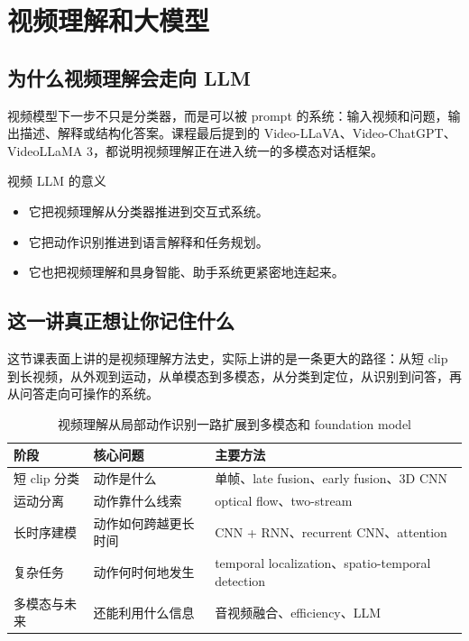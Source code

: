 \section{视频理解和大模型}

\subsection{为什么视频理解会走向 LLM}

视频模型下一步不只是分类器，而是可以被 prompt 的系统：输入视频和问题，输出描述、解释或结构化答案。课程最后提到的 Video-LLaVA、Video-ChatGPT、VideoLLaMA 3，都说明视频理解正在进入统一的多模态对话框架。

\begin{importantbox}{视频 LLM 的意义}
\begin{itemize}
    \item 它把视频理解从分类器推进到交互式系统。
\item 它把动作识别推进到语言解释和任务规划。
    \item 它也把视频理解和具身智能、助手系统更紧密地连起来。
\end{itemize}
\end{importantbox}

\subsection{这一讲真正想让你记住什么}

这节课表面上讲的是视频理解方法史，实际上讲的是一条更大的路径：从短 clip 到长视频，从外观到运动，从单模态到多模态，从分类到定位，从识别到问答，再从问答走向可操作的系统。

\begin{table}[H]
\centering
\begin{tabular}{p{3.1cm}p{3.4cm}p{4.8cm}}
\toprule
\textbf{阶段} & \textbf{核心问题} & \textbf{主要方法} \\
\midrule
短 clip 分类 & 动作是什么 & 单帧、late fusion、early fusion、3D CNN \\
运动分离 & 动作靠什么线索 & optical flow、two-stream \\
长时序建模 & 动作如何跨越更长时间 & CNN + RNN、recurrent CNN、attention \\
复杂任务 & 动作何时何地发生 & temporal localization、spatio-temporal detection \\
多模态与未来 & 还能利用什么信息 & 音视频融合、efficiency、LLM \\
\bottomrule
\end{tabular}
\caption{视频理解从局部动作识别一路扩展到多模态和 foundation model}
\end{table}

